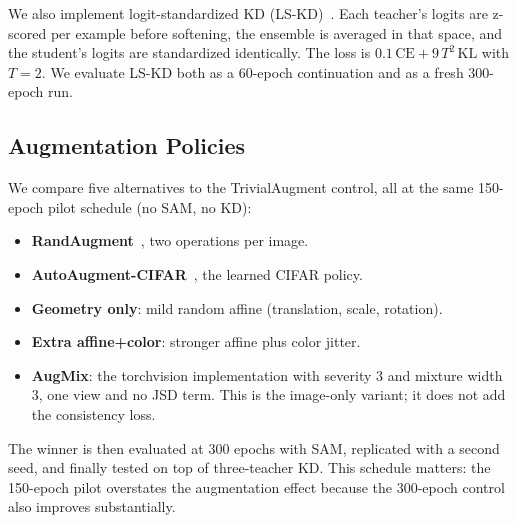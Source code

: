 We also implement logit-standardized KD (LS-KD)~\citep{sun2024logit}. Each teacher's logits are
z-scored per example before softening, the ensemble is averaged in that space, and
the student's logits are standardized identically. The loss is
$0.1\,\mathrm{CE} + 9\,T^2\,\mathrm{KL}$ with $T=2$. We evaluate LS-KD both as a
60-epoch continuation and as a fresh 300-epoch run.

\subsection{Augmentation Policies}

We compare five alternatives to the TrivialAugment control, all at the same
150-epoch pilot schedule (no SAM, no KD):
\begin{itemize}
\item \textbf{RandAugment}~\citep{cubuk2020randaugment}, two operations per image.
\item \textbf{AutoAugment-CIFAR}~\citep{cubuk2019autoaugment}, the learned CIFAR policy.
\item \textbf{Geometry only}: mild random affine (translation, scale, rotation).
\item \textbf{Extra affine+color}: stronger affine plus color jitter.
\item \textbf{AugMix}: the torchvision implementation with severity 3 and mixture
width 3, one view and no JSD term. This is the image-only variant; it does not add
the consistency loss.
\end{itemize}
The winner is then evaluated at 300 epochs with SAM, replicated with a second
seed, and finally tested on top of three-teacher KD. This schedule matters: the
150-epoch pilot overstates the augmentation effect because the 300-epoch control
also improves substantially.
